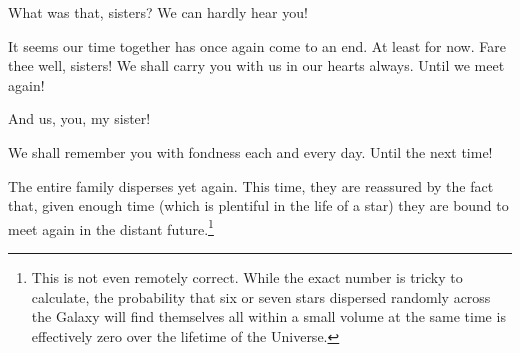 \Lacedaemon What was that, sisters?  We can hardly hear you!

\Celaeno It seems our time together has once again come to an end.  At least for now.  Fare thee well, sisters!  We shall carry you with us in our hearts always.  Until we meet again!

\Maia And us, you, my sister!

\Merope We shall remember you with fondness each and every day.  Until the next time!  

The entire family disperses yet again.  This time, they are reassured by the fact that, given enough time (which is plentiful in the life of a star) they are bound to meet again in the distant future.\footnote{This is not even remotely correct.  While the exact number is tricky to calculate, the probability that six or seven stars dispersed randomly across the Galaxy will find themselves all within a small volume at the same time is effectively zero over the lifetime of the Universe.}

